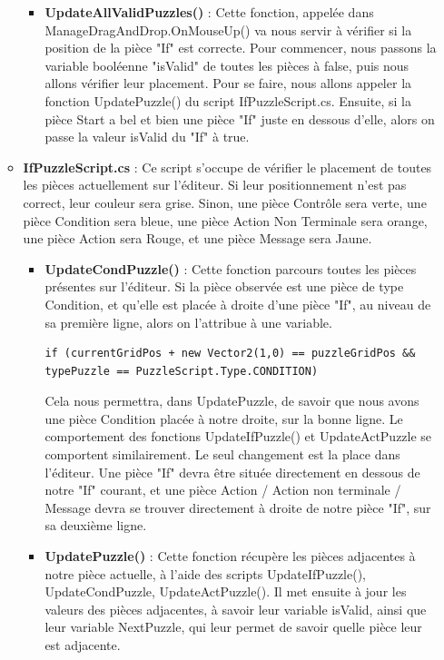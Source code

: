 \documentclass{report}
\begin{document}
\begin{enumerate}[label=\Alph*)]
\begin{itemize}
\begin{itemize}
\item\textbf{UpdateAllValidPuzzles()} : \newline
Cette fonction, appelée dans ManageDragAndDrop.OnMouseUp() va nous servir à vérifier si la position de la pièce "If" est correcte. Pour commencer, nous passons la variable booléenne "isValid" de toutes les pièces à false, puis nous allons vérifier leur placement.\newline
Pour se faire, nous allons appeler la fonction UpdatePuzzle() du script IfPuzzleScript.cs.\newline
Ensuite, si la pièce Start a bel et bien une pièce "If" juste en dessous d'elle, alors on passe la valeur isValid du "If" à true.
\end{itemize}

\item\textbf{IfPuzzleScript.cs} : \newline
Ce script s'occupe de vérifier le placement de toutes les pièces actuellement sur l'éditeur. Si leur positionnement n'est pas correct, leur couleur sera grise. Sinon, une pièce Contrôle sera verte, une pièce Condition sera bleue, une pièce Action Non Terminale sera orange, une pièce Action sera Rouge, et une pièce Message sera Jaune.
\begin{itemize}
\item\textbf{UpdateCondPuzzle()} : \newline
Cette fonction parcours toutes les pièces présentes sur l'éditeur. Si la pièce observée est une pièce de type Condition, et qu'elle est placée à droite d'une pièce "If", au niveau de sa première ligne, alors on l'attribue à une variable.

\begin{lstlisting}[frame=single]
if (currentGridPos + new Vector2(1,0) == puzzleGridPos && typePuzzle == PuzzleScript.Type.CONDITION)
\end{lstlisting}

\smallbreak
Cela nous permettra, dans UpdatePuzzle, de savoir que nous avons une pièce Condition placée à notre droite, sur la bonne ligne.
Le comportement des fonctions UpdateIfPuzzle() et UpdateActPuzzle se comportent similairement. Le seul changement est la place dans l'éditeur. Une pièce "If" devra être située directement en dessous de notre "If" courant, et une pièce Action / Action non terminale / Message devra se trouver directement à droite de notre pièce "If", sur sa deuxième ligne.
\item\textbf{UpdatePuzzle()} : \newline
Cette fonction récupère les pièces adjacentes à notre pièce actuelle, à l'aide des scripts UpdateIfPuzzle(), UpdateCondPuzzle, UpdateActPuzzle(). Il met ensuite à jour les valeurs des pièces adjacentes, à savoir leur variable isValid, ainsi que leur variable NextPuzzle, qui leur permet de savoir quelle pièce leur est adjacente.

\end{itemize}
\end{itemize}
\end{enumerate}
\end{document}
